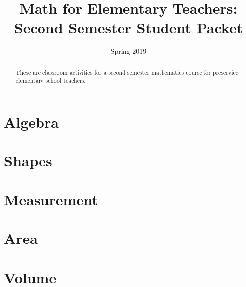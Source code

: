 \documentclass[nooutcomes, numbers, handout]{xourse}
\title{Math for Elementary Teachers: Second Semester Student Packet}
\author{}
\date{Spring 2019}%
\begin{document}
\begin{abstract}
These are classroom activities for a second semester mathematics course for preservice elementary school teachers.
\end{abstract}
\maketitle


\newpage


\part{Algebra}
\newpage





\part{Shapes}
\newpage
{}




\part{Measurement}
\newpage




\part{Area}
\newpage




\part{Volume}
\newpage
\end{document}
